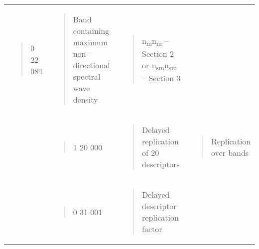 \begin{longtable}[]{@{}llll@{}}
\begin{minipage}[t]{0.22\columnwidth}
\begin{quote}
0 22 084
\end{quote}\strut
\end{minipage} & \begin{minipage}[t]{0.22\columnwidth}\raggedright
\begin{quote}
Band containing maximum non-directional spectral wave density
\end{quote}\strut
\end{minipage} & \begin{minipage}[t]{0.22\columnwidth}\raggedright
\begin{quote}
n\textsubscript{m}n\textsubscript{m} -- Section 2 or n\textsubscript{sm}n\textsubscript{sm} -- Section 3
\end{quote}\strut
\end{minipage}\tabularnewline
\begin{minipage}[t]{0.22\columnwidth}\raggedright
\strut
\end{minipage} & \begin{minipage}[t]{0.22\columnwidth}\raggedright
\begin{quote}
1 20 000
\end{quote}\strut
\end{minipage} & \begin{minipage}[t]{0.22\columnwidth}\raggedright
\begin{quote}
Delayed replication of 20 descriptors
\end{quote}\strut
\end{minipage} & \begin{minipage}[t]{0.22\columnwidth}\raggedright
\begin{quote}
Replication over bands
\end{quote}\strut
\end{minipage}\tabularnewline
\begin{minipage}[t]{0.22\columnwidth}\raggedright
\strut
\end{minipage} & \begin{minipage}[t]{0.22\columnwidth}\raggedright
\begin{quote}
0 31 001
\end{quote}\strut
\end{minipage} & \begin{minipage}[t]{0.22\columnwidth}\raggedright
\begin{quote}
Delayed descriptor replication factor
\end{quote}\strut
\end{minipage} & \begin{minipage}[t]{0.22\columnwidth}\raggedright

\end{minipage}
\end{longtable}
